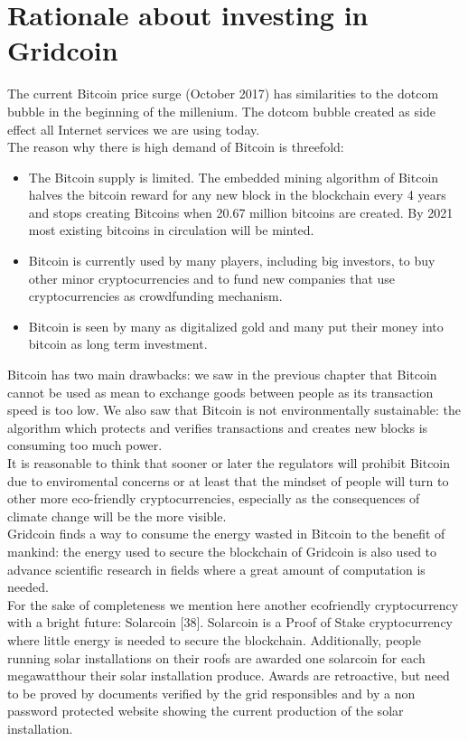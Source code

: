 \section{Rationale about investing in Gridcoin}

The current Bitcoin price surge (October 2017) has similarities to the dotcom bubble in the beginning of the millenium. The dotcom bubble created as side effect all Internet services we are using today.\\

The reason why there is high demand of Bitcoin is threefold:\\

\begin{itemize}
  	\item The Bitcoin supply is limited. The embedded mining algorithm of Bitcoin halves the bitcoin reward for any new block in the blockchain every 4 years and stops creating Bitcoins when 20.67 million bitcoins are created. By 2021 most existing bitcoins in circulation will be minted.
           \item Bitcoin is currently used by many players, including big investors, to buy other minor cryptocurrencies and to fund new companies that use cryptocurrencies as crowdfunding mechanism.
           \item Bitcoin is seen by many as digitalized gold and many put their money into bitcoin as long term investment.  
\end{itemize}

Bitcoin has two main drawbacks: we saw in the previous chapter that Bitcoin cannot be used as mean to exchange goods between people as its transaction speed is too low. We also saw that Bitcoin is not environmentally sustainable: the algorithm which protects and verifies transactions and creates new blocks is consuming too much power.\\

It is reasonable to think that sooner or later the regulators will prohibit Bitcoin due to enviromental concerns or at least that the mindset of people will turn to other more eco-friendly cryptocurrencies, especially as the consequences of climate change will be the more visible.\\

Gridcoin finds a way to consume the energy wasted in Bitcoin to the benefit of mankind: the energy used to secure the blockchain of Gridcoin is also used to advance scientific research in fields where a great amount of computation is needed.\\

For the sake of completeness we mention here another ecofriendly cryptocurrency with a bright future: Solarcoin [38]. Solarcoin is a Proof of Stake cryptocurrency where little energy is needed to secure the blockchain. Additionally, people running solar installations on their roofs are awarded one solarcoin for each megawatthour their solar installation produce. Awards are retroactive, but need to be proved by documents verified by the grid responsibles and by a non password protected website showing the current production of the solar installation.\\
